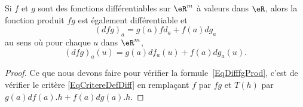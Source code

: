 \begin{lemma}		\label{LemDiffProsuid}
	Si \( f\) et \( g\) sont des fonctions différentiables sur \( \eR^m\) à valeurs dans \( \eR\), alors la fonction produit \( fg\) est également différentiable et
	\begin{equation}		\label{EqDifffgProd}
		(dfg)_a=g(a)fd_a+f(a)dg_a
	\end{equation}
	au sens où pour chaque \( u\) dans \( \eR^m\),
	\begin{equation}
		(dfg)_a(u)=g(a)df_a(u)+f(a)dg_a(u).
	\end{equation}
\end{lemma}

\begin{proof}
	Ce que nous devons faire pour vérifier la formule~\ref{EqDifffgProd}, c'est de vérifier le critère \eqref{EqCritereDefDiff} en remplaçant \( f\) par \( fg\) et \( T(h)\) par \( g(a)df(a).h+f(a)dg(a).h\).


\end{proof}
